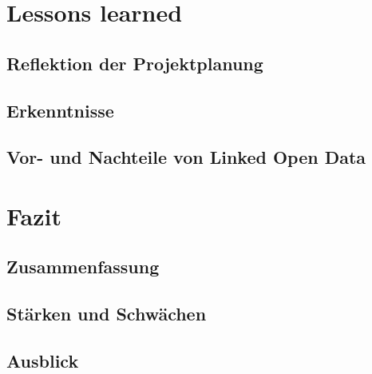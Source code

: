 \documentclass[a4paper, 11pt]{article}
\begin{document}
\section{Lessons learned}
\subsection{Reflektion der Projektplanung}
\subsection{Erkenntnisse}
\subsection{Vor- und Nachteile von Linked Open Data}
\newpage
\section{Fazit}
\subsection{Zusammenfassung}
\subsection{Stärken und Schwächen}
\subsection{Ausblick}

  
\end{document}
